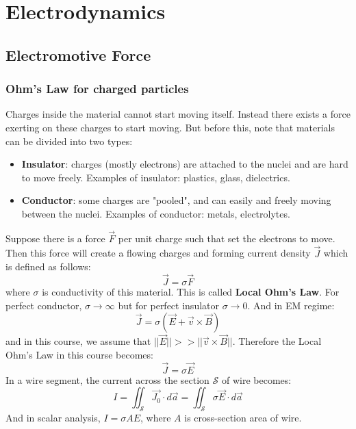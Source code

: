 \documentclass[12pt,a4paper,twoside]{article}
\numberwithin{equation}{section}
\begin{document}
\section{Electrodynamics}
\subsection{Electromotive Force}
\subsubsection{Ohm's Law for charged particles}
Charges inside the material cannot start moving itself. Instead there exists a force exerting on these charges to start moving. But before this, note that materials can be divided into two types:
\begin{itemize}
    \item \textbf{Insulator}: charges (mostly electrons) are attached to the nuclei and are hard to move freely. Examples of insulator: plastics, glass, dielectrics.
    \item \textbf{Conductor}: some charges are "pooled", and can easily and freely moving between the nuclei. Examples of conductor: metals, electrolytes. 
\end{itemize}
Suppose there is a force $\overrightarrow{F}$ per unit charge such that set the electrons to move. Then this force will create a flowing charges and forming current density $\overrightarrow{J}$ which is defined as follows:
\begin{equation}
    \boxed{\overrightarrow{J}=\sigma \overrightarrow{F}}
    \label{eq: local-ohm's-law}
\end{equation}
where $\sigma$ is conductivity of this material. This is called \textbf{Local Ohm's Law}. For perfect conductor, $\sigma\to\infty$ but for perfect insulator $\sigma\to 0$. And in EM regime:
\begin{equation}
    \boxed{\overrightarrow{J}=\sigma(\overrightarrow{E}+\overrightarrow{v}\times \overrightarrow{B})}
\end{equation}
and in this course, we assume that $||\overrightarrow{E}||>>||\overrightarrow{v}\times \overrightarrow{B}||$. Therefore the Local Ohm's Law in this course becomes:
\[\overrightarrow{J}=\sigma \overrightarrow{E}\]
In a wire segment, the current across the section $\mathcal{S}$ of wire becomes:
\[I=\iint_{\mathcal{S}}\overrightarrow{J_0}\cdot d\overrightarrow{a}=\iint_{\mathcal{S}}\sigma\overrightarrow{E}\cdot d\overrightarrow{a}\]
And in scalar analysis, $I=\sigma AE$, where $A$ is cross-section area of wire.\\
\end{document}
